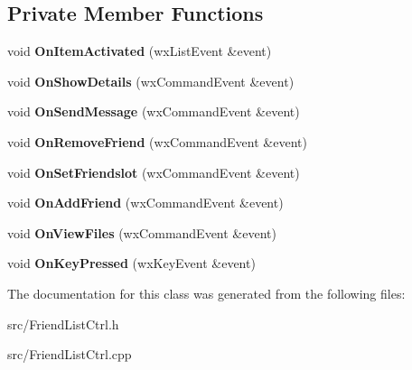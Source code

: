 \subsection*{Private Member Functions}
\begin{DoxyCompactItemize}
\item 
void {\bfseries OnItemActivated} (wxListEvent \&event)\label{classCFriendListCtrl_ad1a355377062182fd4b9ca2b20db509e}

\item 
void {\bfseries OnShowDetails} (wxCommandEvent \&event)\label{classCFriendListCtrl_a9320a69c922426258a897ed7acba5ed8}

\item 
void {\bfseries OnSendMessage} (wxCommandEvent \&event)\label{classCFriendListCtrl_ad9c779639c5e3f0e394b2d74e7101ecb}

\item 
void {\bfseries OnRemoveFriend} (wxCommandEvent \&event)\label{classCFriendListCtrl_a78d51595c19db3023e112c1c4bb1e438}

\item 
void {\bfseries OnSetFriendslot} (wxCommandEvent \&event)\label{classCFriendListCtrl_a8660d72281ac16e70e23ea1978f90c09}

\item 
void {\bfseries OnAddFriend} (wxCommandEvent \&event)\label{classCFriendListCtrl_a06f6663e86bfd61b3576b79641be0594}

\item 
void {\bfseries OnViewFiles} (wxCommandEvent \&event)\label{classCFriendListCtrl_aea9f19badf649ed007b5648dcef5c74d}

\item 
void {\bfseries OnKeyPressed} (wxKeyEvent \&event)\label{classCFriendListCtrl_ad31b2e4efc1f9c3fd0031a4151547f49}

\end{DoxyCompactItemize}


The documentation for this class was generated from the following files:\begin{DoxyCompactItemize}
\item 
src/FriendListCtrl.h\item 
src/FriendListCtrl.cpp\end{DoxyCompactItemize}
